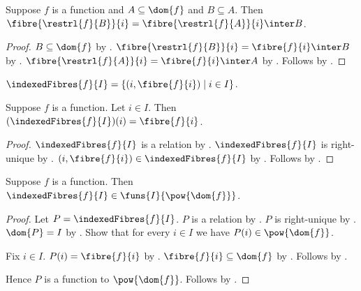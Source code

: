 \begin{proposition}\label{function_fibre_nested_restriction}
    Suppose $f$ is a function and $A\subseteq\dom{f}$ and $B\subseteq A$.
    Then $\fibre{\restrl{f}{B}}{i}
        =\fibre{\restrl{f}{A}}{i}\inter B$.
\end{proposition}
\begin{proof}
    $B\subseteq\dom{f}$ by .
    $\fibre{\restrl{f}{B}}{i}=\fibre{f}{i}\inter B$
        by .
    $\fibre{\restrl{f}{A}}{i}=\fibre{f}{i}\inter A$
        by .
    Follows by .
\end{proof}

\begin{definition}\label{indexed_fibres}
    $\indexedFibres{f}{I}=\{(i,\fibre{f}{i})\mid i\in I\}$.
\end{definition}

\begin{proposition}\label{indexed_fibres_apply}
    Suppose $f$ is a function.
    Let $i\in I$.
    Then $(\indexedFibres{f}{I})(i)=\fibre{f}{i}$.
\end{proposition}
\begin{proof}
    $\indexedFibres{f}{I}$ is a relation
        by .
    $\indexedFibres{f}{I}$ is right-unique
        by .
    $(i,\fibre{f}{i})\in\indexedFibres{f}{I}$
        by .
    Follows by .
\end{proof}

\begin{proposition}\label{indexed_fibres_type}
    Suppose $f$ is a function.
    Then $\indexedFibres{f}{I}\in\funs{I}{\pow{\dom{f}}}$.
\end{proposition}
\begin{proof}
    Let $P=\indexedFibres{f}{I}$.
    $P$ is a relation by .
    $P$ is right-unique by .
    $\dom{P}=I$ by .
    Show that for every $i\in I$ we have $P(i)\in\pow{\dom{f}}$.
    \begin{subproof}
        Fix $i\in I$.
        $P(i)=\fibre{f}{i}$ by .
        $\fibre{f}{i}\subseteq\dom{f}$
            by .
        Follows by .
    \end{subproof}
    Hence $P$ is a function to $\pow{\dom{f}}$.
    Follows by .
\end{proof}

